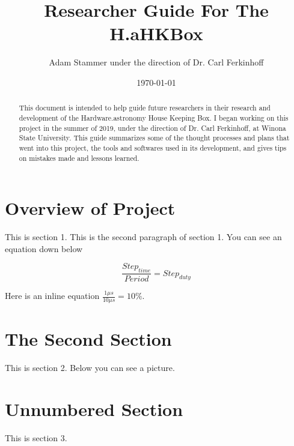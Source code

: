 \documentclass[prb,preprint]{revtex4-1}
\begin{document}
\title{Researcher Guide For The H.aHKBox}
\author{Adam Stammer under the direction of Dr. Carl Ferkinhoff}

\date{\today}

\begin{abstract}
This document is intended to help guide future researchers in their research and development of the Hardware.astronomy House Keeping Box. I began working on this project in the summer of 2019, under the direction of Dr. Carl Ferkinhoff, at Winona State University. This guide summarizes some of the thought processes and plans that went into this project, the tools and softwares used in its development, and gives tips on mistakes made and lessons learned.
\end{abstract}

\maketitle




\section{Overview of Project}
This is section 1.
\newline
This is the second paragraph of section 1. You can see an equation down below

\begin{equation}
\frac{Step_{time}}{Period} = Step_{duty}
\end{equation}



Here is an inline equation $\frac{1\mu s}{10\mu s} = 10\%$.

\section{The Second Section}
This is section 2. Below you can see a picture. 

\section*{Unnumbered Section}
This is section 3.

\end{document}
